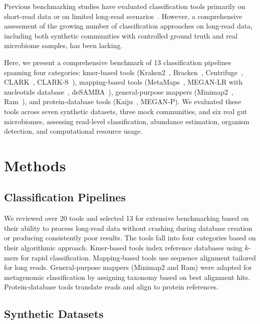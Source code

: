 \documentclass[11pt]{article}
\begin{document}
Previous benchmarking studies have evaluated classification tools primarily on short-read data or on limited long-read scenarios~\citep{escobar2020benchmarking,portik2022evaluation}. However, a comprehensive assessment of the growing number of classification approaches on long-read data, including both synthetic communities with controlled ground truth and real microbiome samples, has been lacking.

Here, we present a comprehensive benchmark of 13 classification pipelines spanning four categories: kmer-based tools (Kraken2~\citep{wood2019improved}, Bracken~\citep{lu2017bracken}, Centrifuge~\citep{kim2016centrifuge}, CLARK~\citep{ounit2015clark}, CLARK-S~\citep{ounit2016clarks}), mapping-based tools (MetaMaps~\citep{dilthey2019metamaps}, MEGAN-LR with nucleotide database~\citep{huson2018megan}, deSAMBA~\citep{yang2021deSAMBA}), general-purpose mappers (Minimap2~\citep{li2018minimap2}, Ram~\citep{vaser2021raven}), and protein-database tools (Kaiju~\citep{menzel2016kaiju}, MEGAN-P). We evaluated these tools across seven synthetic datasets, three mock communities, and six real gut microbiomes, assessing read-level classification, abundance estimation, organism detection, and computational resource usage.

\section{Methods}

\subsection{Classification Pipelines}

We reviewed over 20 tools and selected 13 for extensive benchmarking based on their ability to process long-read data without crashing during database creation or producing consistently poor results. The tools fall into four categories based on their algorithmic approach. Kmer-based tools index reference databases using $k$-mers for rapid classification. Mapping-based tools use sequence alignment tailored for long reads. General-purpose mappers (Minimap2 and Ram) were adapted for metagenomic classification by assigning taxonomy based on best alignment hits. Protein-database tools translate reads and align to protein references.

\subsection{Synthetic Datasets}
\end{document}
